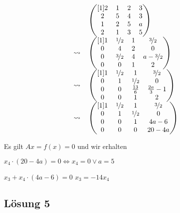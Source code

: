 \documentclass[main.tex]{subfiles}
\begin{document}
\begin{gather*}
    \arraycolsep=0.6em
    \begin{array}{ r l }
        & \begin{pmatrix}[1]
            2 & 1 & 2 & 3 \\
            2 & 5 & 4 & 3 \\
            1 & 2 & 5 & a \\
            2 & 1 & 3 & 5
        \end{pmatrix}\\
        \rightsquigarrow &
        \begin{pmatrix}[1]
            1 & \nicefrac{1}{2} & 1 & \nicefrac{3}{2} \\
            0 &   4 & 2 &   0 \\
            0 & \nicefrac{3}{2} & 4 & a - \nicefrac{3}{2} \\
            0 &   0 & 1 &   2
        \end{pmatrix}\\
        \rightsquigarrow &
        \begin{pmatrix}[1]
            1 & \nicefrac{1}{2} & 1 & \nicefrac{3}{2} \\
            0 & 1 & \nicefrac{1}{2} & 0 \\
            0 & 0 & \frac{13}{6} & \frac{2a}{3} - 1 \\
            0 & 0 & 1 & 2
        \end{pmatrix}\\
        \rightsquigarrow &
        \begin{pmatrix}[1]
            1 & \nicefrac{1}{2} & 1 & \nicefrac{3}{2} \\
            0 & 1 & \nicefrac{1}{2} & 0 \\
            0 & 0 & 1 & 4a - 6 \\
            0 & 0 & 0 & 20 - 4a
        \end{pmatrix}
    \end{array}
\end{gather*}


Es gilt $A x = f(x) = 0$ und wir erhalten

$x_4 \cdot (20-4a) = 0 \Leftrightarrow x_4 = 0 \vee  a = 5$

$x_3 + x_4 \cdot (4a-6)  = 0$
$x_3 = - 14 x_4$



\subsection{Lösung 5}
\end{document}
